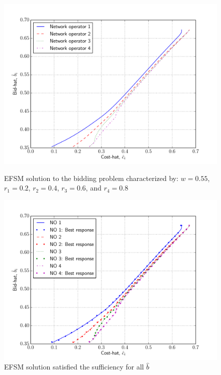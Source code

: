 \begin{figure}[p!]
  \includegraphics[width=\figsize]{Indirect/Figures/efs_4}
  \caption{EFSM solution to the bidding problem characterized by: $w=0.55$, $r_1 = 0.2$, $r_2 = 0.4$, $r_3 = 0.6$, and $r_4 = 0.8$}
  \label{fig:efs_4_indirect}
  \vspace{10mm}
  \includegraphics[width=\figsize]{Indirect/Figures/efs_4_sufficiency}
  \caption{EFSM solution satisfied the sufficiency for all $\hat{b}$}
  \label{fig:efs_4_sufficiency_indirect}
\end{figure}

